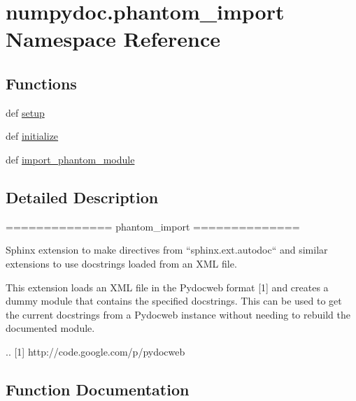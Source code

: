 \hypertarget{namespacenumpydoc_1_1phantom__import}{}\section{numpydoc.\+phantom\+\_\+import Namespace Reference}
\label{namespacenumpydoc_1_1phantom__import}
\subsection*{Functions}
\begin{DoxyCompactItemize}
\item 
def \hyperlink{namespacenumpydoc_1_1phantom__import_a45c5c42fc93ab33948259617874b7a81}{setup}
\item 
def \hyperlink{namespacenumpydoc_1_1phantom__import_a2dbcebca09c9839dd687c26fa6b7958b}{initialize}
\item 
def \hyperlink{namespacenumpydoc_1_1phantom__import_a49cef0a1ab1941e55957f4eea357a021}{import\+\_\+phantom\+\_\+module}
\end{DoxyCompactItemize}


\subsection{Detailed Description}
\begin{DoxyVerb}==============
phantom_import
==============

Sphinx extension to make directives from ``sphinx.ext.autodoc`` and similar
extensions to use docstrings loaded from an XML file.

This extension loads an XML file in the Pydocweb format [1] and
creates a dummy module that contains the specified docstrings. This
can be used to get the current docstrings from a Pydocweb instance
without needing to rebuild the documented module.

.. [1] http://code.google.com/p/pydocweb\end{DoxyVerb}
 

\subsection{Function Documentation}
\hypertarget{namespacenumpydoc_1_1phantom__import_a49cef0a1ab1941e55957f4eea357a021}{}
